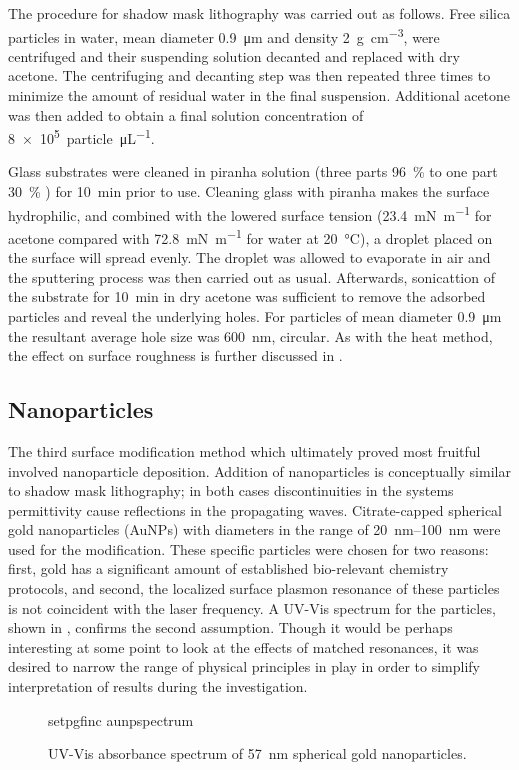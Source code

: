 The procedure for shadow mask lithography was carried out as follows.  Free
silica particles in water, mean diameter \SI{0.9}{\micro\meter} and density
\SI{2}{\gram\per\centi\meter\cubed}, were centrifuged and their suspending
solution decanted and replaced with dry acetone.  The centrifuging and
decanting step was then repeated three times to minimize the amount of
residual water in the final suspension.  Additional acetone was then added
to obtain a final solution concentration of
\SI{8e5}{particle\per\micro\liter}.  

Glass substrates were cleaned in piranha solution (three parts
\SI{96}{\percent}  to one part \SI{30}{\percent} ) for
\SI{10}{\minute} prior to use.  Cleaning glass with piranha makes the
surface hydrophilic, and combined with the lowered surface tension
(\SI{23.4}{\milli\newton\per\meter} for acetone compared with
\SI{72.8}{\milli\newton\per\meter} for water at \SI{20}{\celsius}), a
droplet placed on the surface will spread evenly.  The droplet was allowed
to evaporate in air and the sputtering process was then carried out as
usual.  Afterwards, sonicattion of the substrate for \SI{10}{\minute} in
dry acetone was sufficient to remove the adsorbed particles and reveal the
underlying holes.  For particles of mean diameter \SI{0.9}{\micro\meter}
the resultant average hole size was \SI{600}{\nano\meter}, circular.  As
with the heat method, the effect on surface roughness is further discussed
in .

\subsection{Nanoparticles}
The third surface modification method which ultimately proved most fruitful
involved nanoparticle deposition.  Addition of nanoparticles is
conceptually similar to shadow mask lithography; in both cases
discontinuities in the systems permittivity cause reflections in the
propagating waves.  Citrate-capped spherical gold nanoparticles (AuNPs)
with diameters in the range of \SIrange{20}{100}{\nano\meter} were used for
the modification.  These specific particles were chosen for two reasons:
first, gold has a significant amount of established bio-relevant chemistry
protocols, and second, the localized surface plasmon resonance of these
particles is not coincident with the laser frequency.  A UV-Vis spectrum
for the particles, shown in , confirms the second
assumption.  Though it would be perhaps interesting at some point to look
at the effects of matched resonances, it was desired to narrow the range of
physical principles in play in order to simplify interpretation of results
during the investigation.

\begin{figure}[ht]
 \centering
 {setpgfinc}
 {aunpspectrum}
 \caption{UV-Vis absorbance spectrum of \SI{57}{\nano\meter} spherical gold
 nanoparticles.}
 \label{fig:aunpspectrum}
\end{figure}

